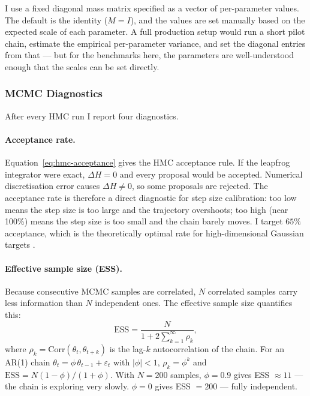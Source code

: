 \documentclass{article}
\begin{document}
I use a fixed diagonal mass matrix specified as a vector of per-parameter values. The default is the identity ($M = I$), and the values are set manually based on the expected scale of each parameter. A full production setup would run a short pilot chain, estimate the empirical per-parameter variance, and set the diagonal entries from that --- but for the benchmarks here, the parameters are well-understood enough that the scales can be set directly.

\subsubsection{MCMC Diagnostics}

After every HMC run I report four diagnostics.

\paragraph{Acceptance rate.}
Equation~\ref{eq:hmc-acceptance} gives the HMC acceptance rule. If the leapfrog integrator were exact, $\Delta H = 0$ and every proposal would be accepted. Numerical discretisation error causes $\Delta H \neq 0$, so some proposals are rejected. The acceptance rate is therefore a direct diagnostic for step size calibration: too low means the step size is too large and the trajectory overshoots; too high (near 100\%) means the step size is too small and the chain barely moves. I target $65\%$ acceptance, which is the theoretically optimal rate for high-dimensional Gaussian targets \cite{beskos2013optimal}.

\paragraph{Effective sample size (ESS).}
Because consecutive MCMC samples are correlated, $N$ correlated samples carry less information than $N$ independent ones. The effective sample size quantifies this:
\begin{equation}
\mathrm{ESS} = \frac{N}{1 + 2\sum_{k=1}^{\infty} \rho_k},
\label{eq:ess-def}
\end{equation}
where $\rho_k = \mathrm{Corr}(\theta_t, \theta_{t+k})$ is the lag-$k$ autocorrelation of the chain. For an AR(1) chain $\theta_t = \phi\,\theta_{t-1} + \varepsilon_t$ with $|\phi| < 1$, $\rho_k = \phi^k$ and $\mathrm{ESS} = N(1-\phi)/(1+\phi)$. With $N = 200$ samples, $\phi = 0.9$ gives ESS $\approx 11$ --- the chain is exploring very slowly. $\phi = 0$ gives ESS $= 200$ --- fully independent.
\end{document}
